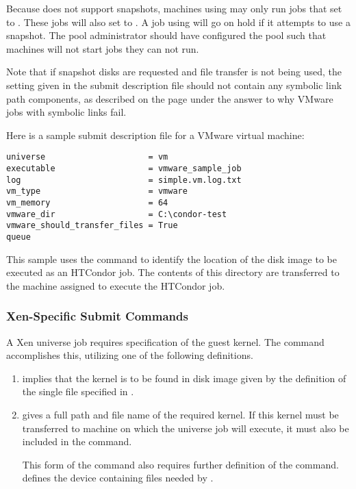 Because  does not support snapshots, 
machines using  may only run  jobs
that set  to .
These jobs will also set
 to .
A job using  will go on hold if it attempts
to use a snapshot.
The pool administrator should have configured the pool
such that machines will not start jobs they can not run.

Note that if snapshot disks are requested and file transfer is not
being used, the  setting given in 
the submit description file
should not contain any symbolic link path components,
as described on the
page under the answer to why VMware jobs with symbolic links fail.

Here is a sample submit description file for a VMware virtual machine:
\begin{verbatim}
universe                     = vm
executable                   = vmware_sample_job
log                          = simple.vm.log.txt
vm_type                      = vmware
vm_memory                    = 64
vmware_dir                   = C:\condor-test
vmware_should_transfer_files = True
queue
\end{verbatim}
This sample uses the  command to identify
the location of the disk image to be executed as an HTCondor job.
The contents of this directory are transferred to the machine assigned
to execute the HTCondor job.

\subsubsection{\label{sec:vm-Xensubmitfile}Xen-Specific Submit Commands}

A Xen  universe job requires specification of the
guest kernel. 
The  command accomplishes this, 
utilizing one of the following definitions.
\begin{enumerate}
\item {} implies that the kernel
  is to be found in disk image given by the definition of the single file
  specified in . 

\item {} gives a full path and
  file name of the required kernel.  If this kernel must be transferred
  to machine on which the  universe job will execute,
  it must also be included in the  command. 

  This form of the  command also requires further
  definition of the  command.
   defines the device containing files needed by
  .

\end{enumerate}

